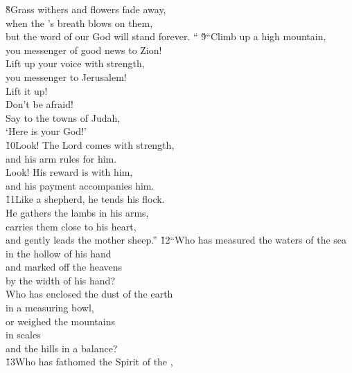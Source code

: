 \begin{poetry}
\poeml \v{8}Grass withers and flowers fade away, \\
\poemll    when the 's breath blows on them, \\
\poemlll       but the word of our God will stand forever. ``
\poeml \v{9}``Climb up a high mountain, \\
\poemll    you messenger of good news to Zion! \\
\poeml Lift up your voice with strength, \\
\poemll    you messenger to Jerusalem! \\
\poeml Lift it up! \\
\poemll    Don't be afraid! \\
\poeml Say to the towns of Judah, \\
\poemll    `Here is your God!' \\
\poeml \v{10}Look! The Lord  comes with strength, \\
\poemll    and his arm rules for him. \\
\poeml Look! His reward is with him, \\
\poemll    and his payment accompanies him. \\
\poeml \v{11}Like a shepherd, he tends his flock. \\
\poemll    He gathers the lambs in his arms, \\
\poeml carries them close to his heart, \\
\poemll    and gently leads the mother sheep.''
\poeml \v{12}``Who has measured the waters of the sea \\
\poemll    in the hollow of his hand \\
\poeml and marked off the heavens \\
\poemll    by the width of his hand? \\
\poeml Who has enclosed the dust of the earth \\
\poemll    in a measuring bowl, \\
\poeml or weighed the mountains \\
\poemll    in scales \\
\poemlll       and the hills in a balance? \\
\poeml \v{13}Who has fathomed the Spirit of the , \\

\end{poetry}
